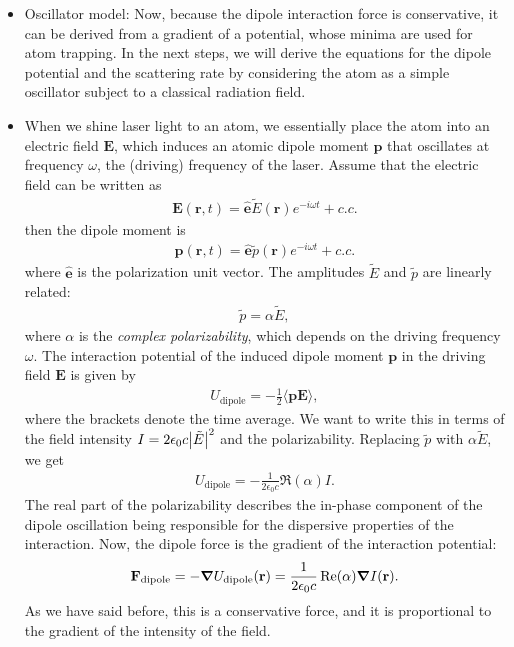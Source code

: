\documentclass{report}
\theoremstyle{definition}
\begin{document}
\begin{itemize}
\begin{itemize}
		
		\item Oscillator model: Now, because the dipole interaction force is conservative, it can be derived from a gradient of a potential, whose minima are used for atom trapping. In the next steps, we will derive the equations for the dipole potential and the scattering rate by considering the atom as a simple oscillator subject to a classical radiation field. 
		
		
		\item When we shine laser light to an atom, we essentially place the atom into an electric field $\textbf{E}$, which induces an atomic dipole moment $\textbf{p}$ that oscillates at frequency $\omega$, the (driving) frequency of the laser. Assume that the electric field can be written as
		\begin{align}
		\textbf{E}(\textbf{r},t) = \mathbf{\hat{e}}\tilde{E}(\textbf{r})e^{-i\omega t} + c.c.
		\end{align}
		then the dipole moment is
		\begin{align}
		\textbf{p}(\textbf{r},t) = \mathbf{\hat{e}}\tilde{p}(\textbf{r})e^{-i\omega t} + c.c.
		\end{align}
		where $\mathbf{\hat{e}}$ is the polarization unit vector. The amplitudes $\tilde{E}$ and $\tilde{p}$ are linearly related:
		\begin{align}
		\tilde{p} = \alpha \tilde{E},
		\end{align}
		where $\alpha$ is the \textit{complex polarizability}, which depends on the driving frequency $\omega$. The interaction potential of the induced dipole moment $\textbf{p}$ in the driving field $\textbf{E}$ is given by
		\begin{align}
		U_{\text{dipole}} = -\frac{1}{2}\langle \textbf{pE} \rangle,
		\end{align}
		where the brackets denote the time average. We want to write this in terms of the field intensity $I = 2\epsilon_0 c\abs{\tilde{E}}^2$ and the polarizability. Replacing $\tilde{p}$ with $\alpha\tilde{E}$, we get
		\begin{align}
		U_{\text{dipole}} = -\frac{1}{2\epsilon_0 c}\Re(\alpha) I.
		\end{align}
		The real part of the polarizability describes the in-phase component of the dipole oscillation being responsible for the dispersive properties of the interaction. Now, the dipole force is the gradient of the interaction potential:
		\begin{align}
		\textbf{F}_\text{dipole} = -\grad{U_\text{dipole}}(\textbf{r}) = \frac{1}{2\epsilon_0 c}\Re(\alpha)\grad{I}(\textbf{r}).
		\end{align}
		As we have said before, this is a conservative force, and it is proportional to the gradient of the intensity of the field. 
		

\end{itemize}
\end{itemize}
\end{document}
